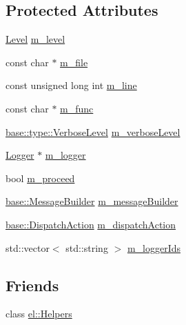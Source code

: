 \subsection*{Protected Attributes}
\begin{DoxyCompactItemize}
\item 
\hyperlink{namespaceel_ab0ac6091262344c52dd2d3ad099e8e36}{Level} \hyperlink{classel_1_1base_1_1_writer_a28522bf9b05b4edcc0baf5196645d317}{m\+\_\+level}
\item 
const char $\ast$ \hyperlink{classel_1_1base_1_1_writer_a1eada1175721ba11b4eb6c9515d8e2dc}{m\+\_\+file}
\item 
const unsigned long int \hyperlink{classel_1_1base_1_1_writer_ac71f81d43f58b80ea31ae248e9fe6a23}{m\+\_\+line}
\item 
const char $\ast$ \hyperlink{classel_1_1base_1_1_writer_a57291e0751fe93547d9d5551fb3e8415}{m\+\_\+func}
\item 
\hyperlink{namespaceel_1_1base_1_1type_a3f79fa74639a13c32f794ba074fe7fb4}{base\+::type\+::\+Verbose\+Level} \hyperlink{classel_1_1base_1_1_writer_a335803052b6878c058a4a888279df04d}{m\+\_\+verbose\+Level}
\item 
\hyperlink{classel_1_1_logger}{Logger} $\ast$ \hyperlink{classel_1_1base_1_1_writer_a0fab2e9a168b7973bcca4574d05490d2}{m\+\_\+logger}
\item 
bool \hyperlink{classel_1_1base_1_1_writer_a238593eda90cf32645c4541e738bea9a}{m\+\_\+proceed}
\item 
\hyperlink{classel_1_1base_1_1_message_builder}{base\+::\+Message\+Builder} \hyperlink{classel_1_1base_1_1_writer_a63763a047d595271cb14f9a80430306b}{m\+\_\+message\+Builder}
\item 
\hyperlink{namespaceel_1_1base_a3aa2563d38e47388ba242a1694fc2839}{base\+::\+Dispatch\+Action} \hyperlink{classel_1_1base_1_1_writer_acbea5b77953cf6e39baab015e83a4100}{m\+\_\+dispatch\+Action}
\item 
std\+::vector$<$ std\+::string $>$ \hyperlink{classel_1_1base_1_1_writer_a9137860437510e1a26e8b0c1814c7ae7}{m\+\_\+logger\+Ids}
\end{DoxyCompactItemize}
\subsection*{Friends}
\begin{DoxyCompactItemize}
\item 
class \hyperlink{classel_1_1base_1_1_writer_a2fb8a2c02cbf86247f093c118bed877a}{el\+::\+Helpers}
\end{DoxyCompactItemize}


